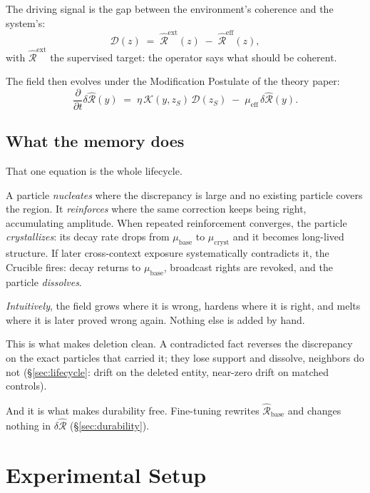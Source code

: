 \documentclass[11pt,twocolumn]{article}
\newcommand{\Cohbase}{\widehat{\mathcal{R}}_{\mathrm{base}}}
\newcommand{\Coheff}{\widehat{\mathcal{R}}^{\mathrm{eff}}}
\newcommand{\Cohext}{\widehat{\mathcal{R}}^{\mathrm{ext}}}
\newcommand{\dCoh}{\delta\widehat{\mathcal{R}}}
\newcommand{\Dscr}{\mathcal{D}}
\newcommand{\Kern}{\mathcal{K}}
\newcommand{\mueff}{\mu_{\mathrm{eff}}}
\theoremstyle{plain}
\begin{document}
The driving signal is the gap between the environment's coherence and the system's:
\begin{equation}
\label{eq:disc}
\Dscr(z) \;=\; \Cohext(z) \;-\; \Coheff(z),
\end{equation}
with $\Cohext$ the supervised target: the operator says what should be coherent.

The field then evolves under the Modification Postulate of the theory paper:
\begin{equation}
\label{eq:mod}
\frac{\partial}{\partial t}\dCoh(y) \;=\; \eta\,\Kern(y, z_S)\,\Dscr(z_S) \;-\; \mueff\,\dCoh(y).
\end{equation}

\subsection{What the memory does}

That one equation is the whole lifecycle.

A particle \emph{nucleates} where the discrepancy is large and no existing particle covers the region. It \emph{reinforces} where the same correction keeps being right, accumulating amplitude. When repeated reinforcement converges, the particle \emph{crystallizes}: its decay rate drops from $\mu_{\mathrm{base}}$ to $\mu_{\mathrm{cryst}}$ and it becomes long-lived structure. If later cross-context exposure systematically contradicts it, the Crucible fires: decay returns to $\mu_{\mathrm{base}}$, broadcast rights are revoked, and the particle \emph{dissolves}.

\emph{Intuitively}, the field grows where it is wrong, hardens where it is right, and melts where it is later proved wrong again. Nothing else is added by hand.

This is what makes deletion clean. A contradicted fact reverses the discrepancy on the exact particles that carried it; they lose support and dissolve, neighbors do not (\S\ref{sec:lifecycle}: drift on the deleted entity, near-zero drift on matched controls).

And it is what makes durability free. Fine-tuning rewrites $\Cohbase$ and changes nothing in $\dCoh$ (\S\ref{sec:durability}).

\section{Experimental Setup}
\label{sec:setup}
\end{document}
